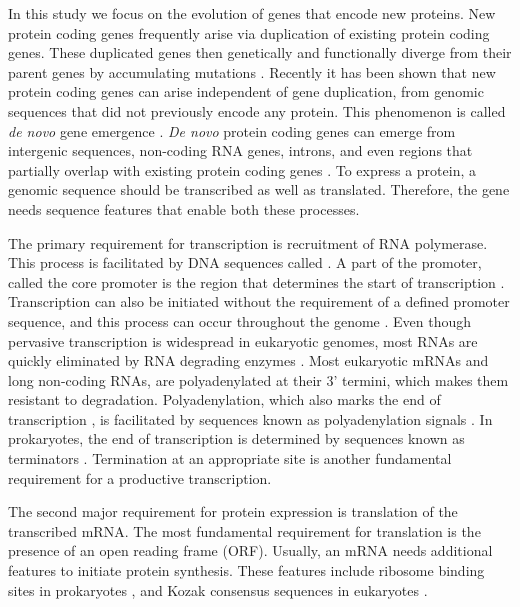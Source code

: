 \documentclass[12pt,a4paper]{article}
\newcommand{\cmnt}[1]{{\color{purple} #1}}
\begin{document}
In this study we focus on the evolution of genes that encode new proteins. New protein coding genes frequently arise via duplication of existing protein coding genes. These duplicated genes then genetically and functionally diverge from their parent genes by accumulating mutations \citep{Long2003,IAD}. Recently it has been shown that new protein coding genes can arise independent of gene duplication, from genomic sequences that did not previously encode any protein. This phenomenon is called \textit{de novo} gene emergence \citep{Tautz2011,Zhao2014,EBB-F1000,Vakirlis2017,vanOss}. \textit{De novo} protein coding genes can emerge from intergenic sequences, non-coding RNA genes, introns, and even regions that partially overlap with existing protein coding genes \citep{Tautz2011,Zhao2014,Vakirlis2017,vanOss,Prabh2019}. To express a protein, a genomic sequence should be transcribed as well as translated. Therefore, the gene needs sequence features that enable both these processes. 

\cmnt{The primary requirement for transcription is recruitment of RNA polymerase. This process is facilitated by DNA sequences called \citep{Promoters}. A part of the promoter, called the core promoter is the region that determines the start of transcription \citep{corepromoters}. Transcription can also be initiated without the requirement of a defined promoter sequence, and this process can occur throughout the genome \cite{PervasiveTranscription}. Even though pervasive transcription is widespread in eukaryotic genomes, most RNAs are quickly eliminated by RNA degrading enzymes \citep{RNAturnover}. Most eukaryotic mRNAs and long non-coding RNAs, are polyadenylated at their 3' termini, which makes them resistant to degradation. Polyadenylation, which also marks the end of transcription \citep{polyAterm}, is facilitated by sequences known as polyadenylation signals \citep{polyA}. In prokaryotes, the end of transcription is determined by sequences known as terminators \citep{ProkTerm}. Termination at an appropriate site is another fundamental requirement for a productive transcription.}

The second major requirement for protein expression is translation of the transcribed mRNA. The most fundamental requirement for translation is the presence of an open reading frame (ORF). Usually, an mRNA needs additional features to initiate protein synthesis. These features include ribosome binding sites in prokaryotes \citep{RBS}, and Kozak consensus sequences in eukaryotes \citep{kozak,kozakDroso,kozakHuman}. 
\end{document}
